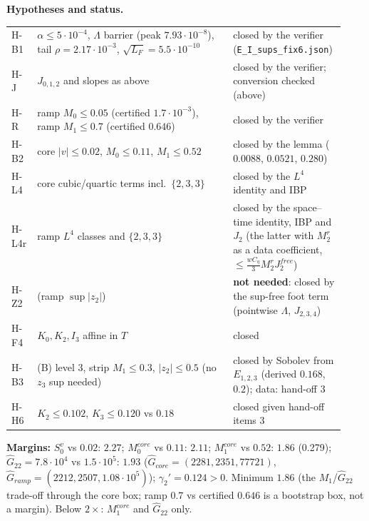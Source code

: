 \documentclass[11pt]{article}
\begin{document}
\textbf{Hypotheses and status.}
\begin{center}\small\begin{tabular}{p{0.07\linewidth}p{0.58\linewidth}p{0.28\linewidth}}
H-B1 & $\alpha\le5\cdot10^{-4}$, $\Lambda$ barrier (peak $7.93\cdot10^{-8}$), tail $\rho=2.17\cdot10^{-3}$, $\sqrt{L_F}=5.5\cdot10^{-10}$ & closed by the verifier (\texttt{E\_I\_sups\_fix6.json})\\
H-J & $J_{0,1,2}$ and slopes as above & closed by the verifier; conversion checked (above)\\
H-R & ramp $M_0\le0.05$ (certified $1.7\cdot10^{-3}$), ramp $M_1\le0.7$ (certified $0.646$) & closed by the verifier\\
H-B2 & core $|v|\le0.02$, $M_0\le0.11$, $M_1\le0.52$ & closed by the lemma ($0.0088$, $0.0521$, $0.280$)\\
H-L4 & core cubic/quartic terms incl.\ $\{2,3,3\}$ & closed by the $L^4$ identity and IBP\\
H-L4r & ramp $L^4$ classes and $\{2,3,3\}$ & closed by the space--time identity, IBP and $J_2$ (the latter with $M_2^r$ as a data coefficient, $\le\tfrac{wC_\eta}{3}M_2^rJ^{free}_2$)\\
H-Z2 & (ramp $\sup|z_2|$) & \textbf{not needed}: closed by the sup-free foot term (pointwise $\Lambda$, $J_{2,3,4}$)\\

H-F4 & $K_0,K_2,I_3$ affine in $T$ & closed\\
H-B3 & (B) level 3, strip $M_1\le0.3$, $|z_2|\le0.5$ (no $z_3$ sup needed) & closed by Sobolev from $E_{1,2,3}$ (derived $0.168$, $0.2$); data: hand-off 3\\
H-H6 & $K_2\le0.102$, $K_3\le0.120$ vs $0.18$ & closed given hand-off items 3\\
\end{tabular}\end{center}
\textbf{Margins:} $S_0^v$ vs $0.02$: $2.27$; $M_0^{core}$ vs $0.11$: $2.11$; $M_1^{core}$ vs $0.52$: $1.86$ (0.279); $\hat G_{22}=7.8\cdot10^4$ vs $1.5\cdot10^5$: $1.93$ ($\hat G_{core}=(2281,2351,77721)$, $\hat G_{ramp}=(2212,2507,1.08\cdot10^5)$); $\gamma_2'=0.124>0$. Minimum $\mathbf{1.86}$ (the $M_1$/$\hat G_{22}$ trade-off through the core box; ramp $0.7$ vs certified $0.646$ is a bootstrap box, not a margin). Below $2\times$: $M_1^{core}$ and $\hat G_{22}$ only.
\end{document}
